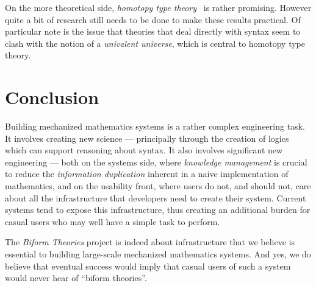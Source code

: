 \documentclass[fleqn]{llncs}
\begin{document}
On the more theoretical side, \emph{homotopy type theory}~\cite{hottbook}
is rather promising.  However quite a bit of research still needs to be
done to make these results practical. Of particular note is the issue
that theories that deal directly with syntax seem to clash with the
notion of a \emph{univalent universe}, which is central to homotopy
type theory.

\section{Conclusion}

Building mechanized mathematics systems is a rather complex engineering
task. It involves creating new science --- principally through the creation
of logics which can support reasoning about syntax.  It also involves significant
new engineering --- both on the systems side, where \emph{knowledge management}
is crucial to reduce the \emph{information duplication} inherent in a
naive implementation of mathematics, and on the usability front, where
users do not, and should not, care about all the infrastructure that 
developers need to create their system. Current systems tend to expose
this infrastructure, thus creating an additional burden for casual users
who may well have a simple task to perform.

The \emph{Biform Theories} project is indeed about infrastructure
that we believe is essential to building large-scale mechanized mathematics
systems. And yes, we do believe that eventual success would imply
that casual users of such a system would never hear of ``biform theories''.




\end{document}
